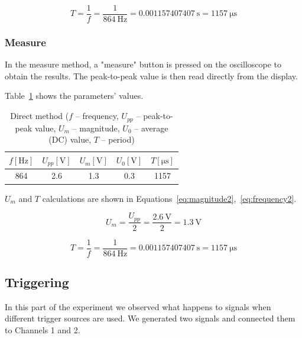 \begin{equation}
	T = \frac{1}{f} = \frac{1}{\SI{864}{\hertz}} = \SI{0.001157407407}{\second} = \SI{1157}{\micro\second}
	\label{eq:frequency2}
\end{equation}


\subsubsection*{Measure}

In the measure method, a "measure" button is pressed on the oscilloscope to obtain the results. The peak-to-peak value is then read directly from the display.

Table~\ref{tab:measure-method} shows the parameters' values.

\begin{table}[H]
	\centering
	\begin{tabular}{c|c|c|c|c}
		$f [\unit{\hertz}]$ & $U_{pp} [\unit{\volt}]$ & $U_{m} [\unit{\volt}]$ & $U_{0} [\unit{\volt}]$ & $T [\unit{\micro\second}]$\\
		\hline
		864 & 2.6 & 1.3 & 0.3 & 1157
	\end{tabular}
	\caption{Direct method ($f$ -- frequency, $U_{pp}$ -- peak-to-peak value, $U_{m}$ -- magnitude, $U_{0}$ -- average (DC) value, $T$ -- period)}
	\label{tab:measure-method}
\end{table}   

$U_{m}$ and $T$ calculations are shown in Equations~\ref{eq:magnitude2},~\ref{eq:frequency2}.

\begin{equation}
	U_{m} = \frac{U_{pp}}{2} = \frac{\SI{2.6}{\volt}}{2} = \SI{1.3}{\volt}
	\label{eq:magnitude2}
\end{equation}

\begin{equation}
	T = \frac{1}{f} = \frac{1}{\SI{864}{\hertz}} = \SI{0.001157407407}{\second} = \SI{1157}{\micro\second}
	\label{eq:frequency2}
\end{equation}

\subsection{Triggering}

In this part of the experiment we observed what happens to signals when different trigger sources are used. We generated two signals and connected them to Channels 1 and 2.

